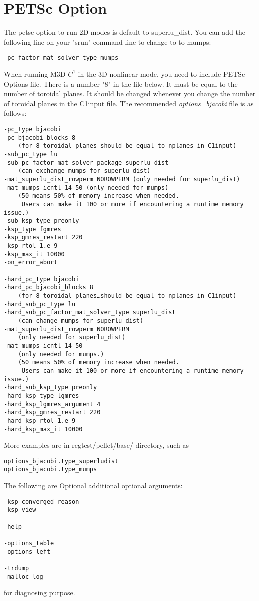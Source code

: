 \section{PETSc Option}

\noindent
The petsc option to run 2D modes is default to superlu\_dist. You can add the following line on your "srun" command line
to change to to mumps:

\begin{verbatim}
-pc_factor_mat_solver_type mumps
\end{verbatim}

\noindent
When running M3D-$C^1$ in the 3D nonlinear mode, you need to include PETSc Options file.
There is a number "8" in the file below. It must be equal to the number of toroidal planes. It
should be changed whenever you change the number of toroidal planes in the C1input file. The recommended
{\it options\_bjacobi} file is as follows:

\begin{verbatim}
-pc_type bjacobi
-pc_bjacobi_blocks 8
    (for 8 toroidal planes should be equal to nplanes in C1input)
-sub_pc_type lu
-sub_pc_factor_mat_solver_package superlu_dist
    (can exchange mumps for superlu_dist)
-mat_superlu_dist_rowperm NOROWPERM (only needed for superlu_dist)
-mat_mumps_icntl_14 50 (only needed for mumps)
    (50 means 50% of memory increase when needed.
     Users can make it 100 or more if encountering a runtime memory issue.)
-sub_ksp_type preonly
-ksp_type fgmres
-ksp_gmres_restart 220
-ksp_rtol 1.e-9
-ksp_max_it 10000
-on_error_abort

-hard_pc_type bjacobi
-hard_pc_bjacobi_blocks 8
    (for 8 toroidal planes…should be equal to nplanes in C1input)
-hard_sub_pc_type lu
-hard_sub_pc_factor_mat_solver_type superlu_dist
    (can change mumps for superlu_dist)
-mat_superlu_dist_rowperm NOROWPERM
    (only needed for superlu_dist)
-mat_mumps_icntl_14 50
    (only needed for mumps.)
    (50 means 50% of memory increase when needed.
     Users can make it 100 or more if encountering a runtime memory issue.)
-hard_sub_ksp_type preonly
-hard_ksp_type lgmres
-hard_ksp_lgmres_argument 4
-hard_ksp_gmres_restart 220
-hard_ksp_rtol 1.e-9
-hard_ksp_max_it 10000
\end{verbatim}

\noindent
More examples are in regtest/pellet/base/ directory, such as 

\begin{verbatim}
options_bjacobi.type_superludist
options_bjacobi.type_mumps 
\end{verbatim}

\noindent
The following are Optional additional optional arguments:

\begin{verbatim}
-ksp_converged_reason
-ksp_view

-help

-options_table
-options_left

-trdump
-malloc_log
\end{verbatim}

for diagnosing purpose.
